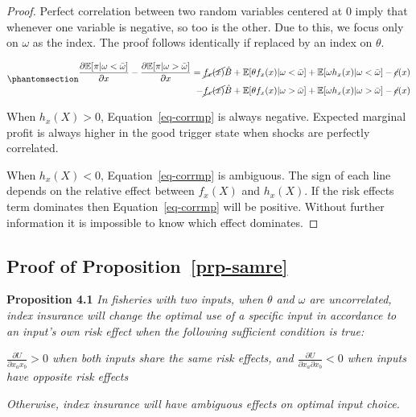\documentclass[
  letterpaper,
  DIV=11,
  numbers=noendperiod]{scrartcl}
\theoremstyle{plain}
\theoremstyle{plain}
\theoremstyle{remark}
\begin{document}
\begin{proof}
Perfect correlation between two random variables centered at 0 imply
that whenever one variable is negative, so too is the other. Due to
this, we focus only on \(\omega\) as the index. The proof follows
identically if replaced by an index on \(\theta\).

\begin{equation}\phantomsection\label{eq-corrmp}{
\begin{aligned}
\frac{\partial \mathbb{E}[\pi|\omega<\bar\omega]}{\partial x}-\frac{\partial \mathbb{E}[\pi|\omega>\bar\omega]}{\partial x}=\cancel{f_{x}(x)}\hat{B}+\mathbb{E}[\theta f_x(x)|\omega<\bar\omega]+\mathbb{E}[\omega h_{x}(x)|\omega<\bar\omega]-\cancel c(x)\\
-\cancel{f_{x}(x)}\hat{B}+\mathbb{E}[\theta f_x(x)|\omega>\bar\omega]+\mathbb{E}[\omega h_{x}(x)|\omega>\bar\omega]-\cancel c(x)
\end{aligned}
}\end{equation}

When \(h_x(X)>0\), Equation~\ref{eq-corrmp} is always negative. Expected
marginal profit is always higher in the good trigger state when shocks
are perfectly correlated.

When \(h_x(X)<0\), Equation~\ref{eq-corrmp} is ambiguous. The sign of
each line depends on the relative effect between \(f_x(X)\) and
\(h_x(X)\). If the risk effects term dominates then
Equation~\ref{eq-corrmp} will be positive. Without further information
it is impossible to know which effect dominates.
\end{proof}

\subsection{\texorpdfstring{Proof of
Proposition~\ref{prp-samre}}{Proof of Proposition~}}\label{sec-samre}

\textbf{Proposition 4.1} \emph{In fisheries with two inputs, when
\(\theta\) and \(\omega\) are uncorrelated, index insurance will change
the optimal use of a specific input in accordance to an input's own risk
effect when the following sufficient condition is true:}

\emph{\(\frac{\partial U}{\partial x_a x_b}>0\) when both inputs share
the same risk effects, and
\(\frac{\partial U}{\partial x_a \partial x_b}<0\) when inputs have
opposite risk effects}

\emph{Otherwise, index insurance will have ambiguous effects on optimal
input choice.}
\end{document}

